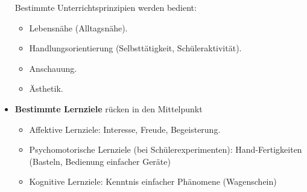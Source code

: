 \begin{itemize}
	\bitem
	{Bestimmte Unterrichtsprinzipien} werden bedient:
	\begin{itemize}
		\item
		Lebensn\"{a}he (Alltagsn\"{a}he).
		\item
		Handlungsorientierung (Selbstt\"{a}tigkeit, Sch\"{u}leraktivit\"{a}t).
		\item
		Anschauung.
		\item
		\"{A}sthetik.
		\end{itemize}
		
		\item
		{\bf Bestimmte Lernziele} r\"{u}cken in den Mittelpunkt
		\begin{itemize}
		\item
		Affektive Lernziele: Interesse, Freude, Begeisterung.
		\item
		Psychomotorische Lernziele (bei Sch\"{u}lerexperimenten):
		Hand-Fertigkeiten (Basteln, Bedienung einfacher Ger\"{a}te)
		\item
		Kognitive Lernziele: Kenntnis einfacher Ph\"{a}nomene (Wagenschein)
	\end{itemize}
\end{itemize}

